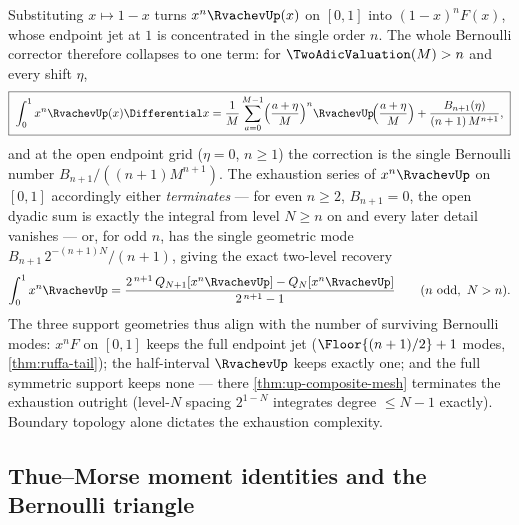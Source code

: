 \documentclass[11pt,oneside]{article}
\numberwithin{equation}{section}
\theoremstyle{definition}
\theoremstyle{remark}
\begin{document}
Substituting $x\mapsto1-x$ turns $x^{n}\RvachevUp(x)$ on $[0,1]$ into
$(1-x)^{n}F(x)$, whose endpoint jet at $1$ is concentrated in the
single order $n$.  The whole Bernoulli corrector therefore collapses
to one term: for $\TwoAdicValuation(M)>n$ and every shift $\eta$,
\begin{equation}
 \boxed{\;
 \int_0^1x^{n}\RvachevUp(x)\Differential x
 =\frac1M\sum_{a=0}^{M-1}
 \Bigl(\frac{a+\eta}{M}\Bigr)^{n}
 \RvachevUp\!\Bigl(\frac{a+\eta}{M}\Bigr)
 +\frac{B_{n+1}(\eta)}{(n+1)\,M^{n+1}},\;}
 \label{eq:half-up-rule}
\end{equation}
and at the open endpoint grid ($\eta=0$, $n\ge1$) the correction is
the single Bernoulli number $B_{n+1}/((n+1)M^{n+1})$.  The exhaustion
series of $x^{n}\RvachevUp$ on $[0,1]$ accordingly either \emph{terminates}
--- for even $n\ge2$, $B_{n+1}=0$, the open dyadic sum is exactly the
integral from level $N\ge n$ on and every later detail vanishes ---
or, for odd $n$, has the single geometric mode
$B_{n+1}\,2^{-(n+1)N}/(n+1)$, giving the exact two-level recovery
\begin{equation}
 \int_0^1x^{n}\RvachevUp
 =\frac{2^{\,n+1}\,Q_{N+1}[x^{n}\RvachevUp]-Q_N[x^{n}\RvachevUp]}{2^{\,n+1}-1}
 \qquad(n\ \text{odd},\ N>n).
 \label{eq:half-up-two-level}
\end{equation}
The three support geometries thus align with the number of surviving
Bernoulli modes: $x^{n}F$ on $[0,1]$ keeps the full endpoint jet
($\Floor{(n+1)/2}+1$ modes, \cref{thm:ruffa-tail}); the half-interval
$\RvachevUp$ keeps exactly one; and the full symmetric support keeps none ---
there \cref{thm:up-composite-mesh} terminates the exhaustion outright
(level-$N$ spacing $2^{1-N}$ integrates degree $\le N-1$ exactly).
Boundary topology alone dictates the exhaustion complexity.

\subsection{Thue--Morse moment identities and the Bernoulli triangle}
\end{document}
